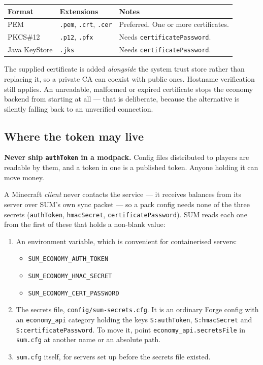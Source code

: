 \documentclass[11pt,a4paper]{article}
\newcommand{\code}[1]{\texttt{\small #1}}
\newcommand{\keybox}[2]{%
  \par\vspace{0.5em}\noindent
  \colorbox{#1}{\begin{minipage}{\dimexpr\linewidth-2\fboxsep\relax}
  \vspace{0.35em}\small #2\vspace{0.35em}\end{minipage}}\par\vspace{0.5em}}
\newcommand{\warn}[1]{\keybox{omceWarnWash}{#1}}
\begin{document}
\begin{tabularx}{\linewidth}{L{3.0cm} L{4.0cm} X}
\toprule
\textbf{Format} & \textbf{Extensions} & \textbf{Notes}\\
\midrule
PEM           & \code{.pem}, \code{.crt}, \code{.cer} & Preferred. One or more certificates.\\
PKCS\#12      & \code{.p12}, \code{.pfx}              & Needs \code{certificatePassword}.\\
Java KeyStore & \code{.jks}                           & Needs \code{certificatePassword}.\\
\bottomrule
\end{tabularx}

The supplied certificate is added \emph{alongside} the system trust store rather than replacing
it, so a private CA can coexist with public ones. Hostname verification still applies. An
unreadable, malformed or expired certificate stops the economy backend from starting at all ---
that is deliberate, because the alternative is silently falling back to an unverified connection.

\subsection{Where the token may live}
\label{sec:secrets}

\warn{\textbf{Never ship \code{authToken} in a modpack.} Config files distributed to players are
readable by them, and a token in one is a published token. Anyone holding it can move money.}

A Minecraft \emph{client} never contacts the service --- it receives balances from its server over
SUM's own sync packet --- so a pack config needs none of the three secrets (\code{authToken},
\code{hmacSecret}, \code{certificatePassword}). SUM reads each one from the first of these that
holds a non-blank value:

\begin{enumerate}
\item An environment variable, which is convenient for containerised servers:
      \begin{itemize}
      \item \code{SUM\_ECONOMY\_AUTH\_TOKEN}
      \item \code{SUM\_ECONOMY\_HMAC\_SECRET}
      \item \code{SUM\_ECONOMY\_CERT\_PASSWORD}
      \end{itemize}
\item The secrets file, \code{config/sum-secrets.cfg}. It is an ordinary Forge config with an
      \code{economy\_api} category holding the keys \code{S:authToken}, \code{S:hmacSecret} and
      \code{S:certificatePassword}. To move it, point \code{economy\_api.secretsFile} in
      \code{sum.cfg} at another name or an absolute path.
\item \code{sum.cfg} itself, for servers set up before the secrets file existed.
\end{enumerate}
\end{document}
